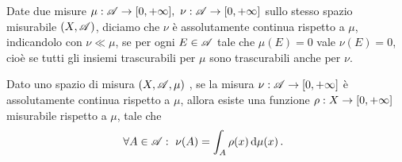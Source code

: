 \begin{definition}\label{def:AssolutamenteContinua}
	Date due misure $\mu:\mathscr A\to[0,+\infty],\ \nu:\mathscr A\to[0,+\infty]$ sullo stesso spazio misurabile $(X,\mathscr A)$, diciamo che $\nu$ è assolutamente continua rispetto a $\mu$, indicandolo con $\nu\ll\mu$, se per ogni $E\in\mathscr A$ tale che $\mu(E)=0$ vale $\nu(E)=0$, cioè se tutti gli insiemi trascurabili per $\mu$ sono trascurabili anche per $\nu$.
\end{definition}

\begin{theorem} \label{thm:RadonNikodym}
	Dato uno spazio di misura $(X,\mathscr A,\mu)$ \sigfin[o], se la misura $\nu:\mathscr A\to[0,+\infty]$ è assolutamente continua rispetto a $\mu$, allora esiste una funzione $\rho:X\to[0,+\infty]$ misurabile rispetto a $\mu$, tale che
	\begin{equation*}
		\forall A\in\mathscr A:\ \nu(A)=\int_A \rho(x)\,\mathrm d\mu(x)\, \text{. }
	\end{equation*}
\end{theorem}

